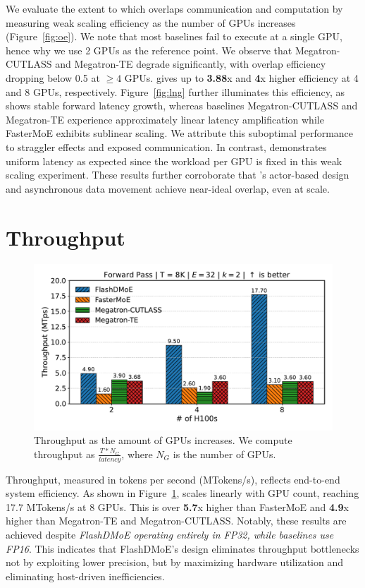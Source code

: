 We evaluate the extent to which \sysname overlaps communication and computation by measuring weak scaling efficiency
as the number of GPUs increases (Figure~\ref{fig:oe}).
We note that most baselines fail to execute at a single GPU, hence why we use 2 GPUs as the reference point.
We observe that Megatron-CUTLASS and Megatron-TE degrade significantly,
with overlap efficiency dropping below 0.5 at $\geq 4$ GPUs. \sysname gives up to \textbf{3.88}x and
\textbf{4}x higher efficiency at 4 and 8 GPUs, respectively.
Figure~\ref{fig:lng} further illuminates this efficiency, as \sysname shows stable forward latency growth,
whereas baselines Megatron-CUTLASS and Megatron-TE experience approximately linear
latency amplification while FasterMoE exhibits sublinear scaling.
We attribute this suboptimal performance to straggler effects and exposed communication.
In contrast, \sysname demonstrates uniform latency as expected since the workload per
GPU is fixed in this weak scaling experiment.
These results further corroborate that \sysname's actor-based design and asynchronous data movement
achieve near-ideal overlap, even at scale.
\section{Throughput}\label{sec:throughput}
\begin{figure}[!ht]
    \centering
    \centering
    \includegraphics[width=0.7\linewidth, keepaspectratio]{figures/throughput_8}
    \caption{Throughput as the amount of GPUs increases. We compute throughput as $\frac{T * N_G}{latency}$, where
        $N_G$ is the number of GPUs.}
    \label{fig:thr}
\end{figure}
Throughput, measured in tokens per second (MTokens/s), reflects end-to-end system efficiency.
As shown in Figure~\ref{fig:thr}, \sysname
scales linearly with GPU count,
reaching 17.7 MTokens/s at 8 GPUs.
This is over \textbf{5.7}x higher than FasterMoE and \textbf{4.9}x higher than Megatron-TE and Megatron-CUTLASS\@.
Notably, these results are achieved despite \emph{FlashDMoE operating entirely in FP32,
    while baselines use FP16}.
This indicates that FlashDMoE’s design eliminates throughput bottlenecks not by
exploiting lower precision, but by maximizing hardware utilization and eliminating host-driven inefficiencies.
